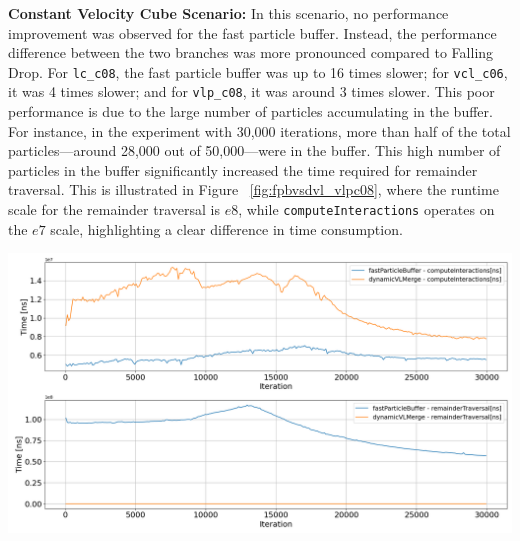 \textbf{Constant Velocity Cube Scenario:}
In this scenario, no performance improvement was observed for the fast particle buffer. Instead, the performance difference between the two branches was more pronounced compared to Falling Drop. For \texttt{lc\_c08}, the fast particle buffer was up to 16 times slower; for \texttt{vcl\_c06}, it was 4 times slower; and for \texttt{vlp\_c08}, it was around 3 times slower.
This poor performance is due to the large number of particles accumulating in the buffer. For instance, in the experiment with 30,000 iterations, more than half of the total particles—around 28,000 out of 50,000—were in the buffer. This high number of particles in the buffer significantly increased the time required for remainder traversal. This is illustrated in Figure ~\ref{fig:fpbvsdvl_vlpc08}, where the runtime scale for the remainder traversal is $e8$, while \texttt{computeInteractions} operates on the $e7$ scale, highlighting a clear difference in time consumption.



\begin{center}
\includegraphics[width=\linewidth]{graphs/constantVelocityCube/normalExperiments/iter/vlpc08dvlpb.png}
\label{fig:fpbvsdvl_vlpc08}
\end{center}




